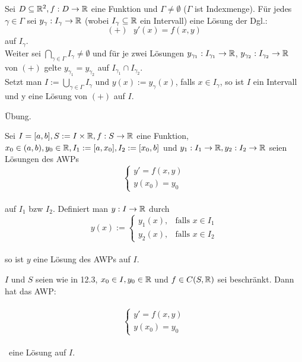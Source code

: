 \documentclass[a4paper,twoside,DIV15,BCOR12mm]{scrbook}
\begin{document}
\begin{satz}
Sei $D \subseteq \mathbb{R}^2, f: D \to \mathbb{R}$ eine Funktion und $\Gamma \neq \emptyset$ ($\Gamma$ ist Indexmenge). 
Für jedes $\gamma \in \Gamma$ sei $y_{\gamma}: I_{\gamma} \to \mathbb{R}$ (wobei $I_{\gamma} \subseteq \mathbb{R}$ ein Intervall) eine Lösung der Dgl.: $$(+)\text{ } y'(x) = f(x,y)$$ 
auf $I_{\gamma}$.\\ 
Weiter sei $\bigcap_{\gamma \in \Gamma} I_{\gamma} \neq \emptyset$ und für je zwei Lösungen $y_{\gamma_1}: I_{\gamma_1} \to \mathbb{R}$, $y_{\gamma_2}: I_{\gamma_2} \to \mathbb{R}$ von $(+)$ gelte 
$y_{\gamma_1} = y_{\gamma_2}$ auf $I_{\gamma_1} \cap I_{\gamma_2}$.\\
Setzt man $I := \bigcup_{\gamma \in \Gamma} I_{\gamma}$ und $y(x) := y_{\gamma}(x)$, falls $x \in I_{\gamma}$, so ist $I$ ein Intervall und y eine Lösung von $(+)$
auf $I$. 
\end{satz}

\begin{beweis}
Übung.
\end{beweis}

\begin{folgerung}
Sei $I = [a,b], S:= I \times \mathbb{R}, f:S \to \mathbb{R}$ eine Funktion, $x_0 \in (a,b), y_0 \in \mathbb{R}, I_1 := [a,x_0], I_2 := [x_0,b]$ und 
$y_1: I_1 \to \mathbb{R}, y_2: I_2 \to \mathbb{R}$ seien Lösungen des AWPs \\
$$\begin{cases} y' = f(x,y) \\ y(x_0) = y_0 \end{cases}$$ \\ auf $I_1$ bzw $I_2$. Definiert man $y:I \to \mathbb{R}$ durch \\
$$y(x):=
\begin{cases}
y_1(x), & \text{falls } x \in I_1  \\
y_2(x), & \text{falls } x \in I_2
\end{cases}$$\\
so ist $y$ eine Lösung des AWPs auf $I$.
\end{folgerung}

\begin{satz}
$I$ und $S$ seien wie in 12.3, $x_0 \in I, y_0 \in \mathbb{R}$ und $ f \in C(S,\mathbb{R})$ sei beschränkt.
Dann hat das AWP: \\\ $$\begin{cases} y' = f(x,y) \\ y(x_0) = y_0 \end{cases}$$ \\\ eine Lösung auf $I$. \\
\end{satz}
\end{document}
